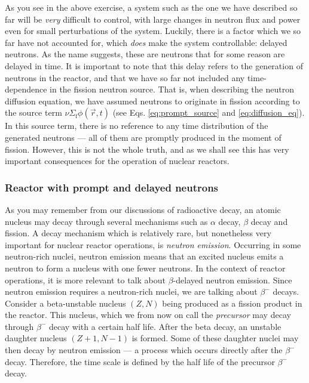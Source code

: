 As you see in the above exercise, a system such as the one we have described so far will be \emph{very} difficult to control, with large changes in neutron flux and power even for small perturbations of the system. Luckily, there is a factor which we so far have not accounted for, which \emph{does} make the system controllable: delayed neutrons. As the name suggests, these are neutrons that for some reason are delayed in time. It is important to note that this delay refers to the generation of neutrons in the reactor, and that we have so far not included any time-dependence in the fission neutron source. That is, when describing the neutron diffusion equation, we have assumed neutrons to originate in fission according to the source term $\nu \Sigma_\text{f}\phi(\vec{r}, t)$ (see Eqs. \ref{eq:prompt_source} and \ref{eq:diffusion_eq}). In this source term, there is no reference to any time distribution of the generated neutrons --- all of them are promptly produced in the moment of fission. However, this is not the whole truth, and as we shall see this has very important consequences for the operation of nuclear reactors.

\subsubsection{Reactor with prompt and delayed neutrons}
As you may remember from our discussions of radioactive decay, an atomic nucleus may decay through several mechanisms such as $\alpha$ decay, $\beta$ decay and fission. A decay mechanism which is relatively rare, but nonetheless very important for nuclear reactor operations, is \emph{neutron emission}. Occurring in some neutron-rich nuclei, neutron emission means that an excited nucleus emits a neutron to form a nucleus with one fewer neutrons. In the context of reactor operations, it is more relevant to talk about $\beta$-delayed neutron emission. Since neutron emission requires a neutron-rich nuclei, we are talking about $\beta^-$ decays. Consider a beta-unstable nucleus $(Z, N)$ being produced as a fission product in the reactor. This nucleus, which we from now on call the \emph{precursor} may decay through $\beta^-$ decay with a certain half life. After the beta decay, an unstable daughter nucleus $(Z+1, N-1)$ is formed. Some of these daughter nuclei may then decay by neutron emission --- a process which occurs directly after the $\beta^-$ decay. Therefore, the time scale is defined by the half life of the precursor $\beta^-$ decay.

